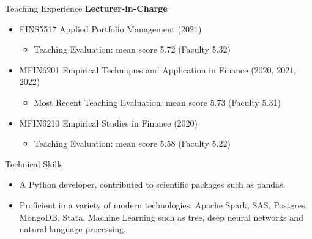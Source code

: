 \documentclass{resume} %
\begin{document}
\begin{rSection}{Teaching Experience}
	\textbf{Lecturer-in-Charge}
	\begin{itemize}
		\item FINS5517 Applied Portfolio Management (2021)
		      \begin{itemize}
			      \item Teaching Evaluation: mean score 5.72 (Faculty 5.32)
		      \end{itemize}
		\item MFIN6201 Empirical Techniques and Application in Finance (2020, 2021, 2022)
		      \begin{itemize}
			      \item Most Recent Teaching Evaluation: mean score 5.73 (Faculty 5.31)
		      \end{itemize}
		\item MFIN6210 Empirical Studies in Finance (2020)
		      \begin{itemize}
			      \item Teaching Evaluation: mean score 5.58 (Faculty 5.22)
		      \end{itemize}
	\end{itemize}
\end{rSection}


\begin{rSection}{Technical Skills}
	\begin{itemize}
		\item A Python developer, contributed to scientific packages such as pandas.
		\item Proficient in a variety of modern technologies: Apache Spark, SAS, Postgres, MongoDB, Stata, Machine Learning such as tree, deep neural networks and natural language processing.
	\end{itemize}
\end{rSection}
\end{document}
